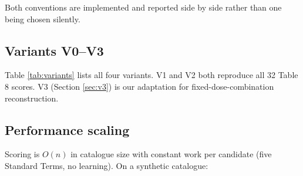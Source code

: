 \documentclass[a4paper]{elsarticle}
\begin{document}
Both conventions are implemented and reported side by side rather than one being chosen silently.

\subsection{Variants V0--V3}
\label{sec:results-variants}

\begin{table}[htbp]
\centering\small
\caption{Variant summary. V3 is our MediGen fixed-dose-combination composite extension; it is not evaluated against published ground truth because the specification publishes no FC DS score.}
\label{tab:variants}
\end{table}

Table \ref{tab:variants} lists all four variants. V1 and V2 both reproduce all 32 Table 8 scores. V3 (Section \ref{sec:v3}) is our adaptation for fixed-dose-combination reconstruction.

\subsection{Performance scaling}
\label{sec:results-scaling}

Scoring is $O(n)$ in catalogue size with constant work per candidate (five Standard Terms, no learning). On a synthetic catalogue:

\begin{table}[htbp]
\centering\small
\caption{Runtime and memory scaling of the scoring algorithm. Synthetic catalogue; no accuracy claimed.}
\label{tab:scaling}
\end{table}
\end{document}
